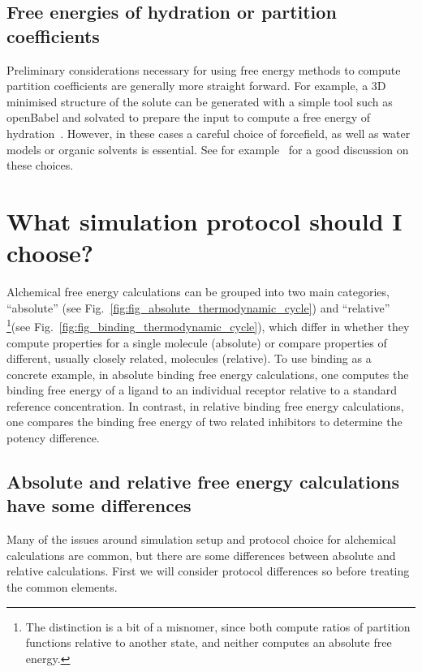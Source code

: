 \documentclass[9pt,bestpractices]{livecoms}
\begin{document}
\subsection{Free energies of hydration or partition coefficients}
\label{subsec:hydration}
Preliminary considerations necessary for using free energy methods to compute partition coefficients are generally more straight forward. For example, a 3D minimised structure of the solute can be generated with a simple tool such as openBabel and solvated to prepare the input  to compute a free energy of hydration~\cite{oboyle2011open}. However, in these cases a careful choice of forcefield, as well as water models or organic solvents is essential. See for example~\cite{bosisio2016blinded,rustenburg2016measuring} for a good discussion on these choices. 
%
\section{What simulation protocol should I choose?}
\label{sec:simulation_protocol_choice}
Alchemical free energy calculations can be grouped into two main categories, ``absolute'' (see Fig.~\ref{fig:fig_absolute_thermodynamic_cycle}) and ``relative'' \footnote{The distinction is a bit of a misnomer, since both compute ratios of partition functions relative to another state, and neither computes an absolute free energy.}(see Fig.~\ref{fig:fig_binding_thermodynamic_cycle}), which differ in whether they compute properties for a single molecule (absolute) or compare properties of different, usually closely related, molecules (relative).
To use binding as a concrete example, in absolute binding free energy calculations, one computes the binding free energy of a ligand to an individual receptor relative to a standard reference concentration.
%
In contrast, in relative binding free energy calculations, one compares the binding free energy of two related inhibitors to determine the potency difference.
%
\subsection{Absolute and relative free energy calculations have some differences}
Many of the issues around simulation setup and protocol choice for alchemical calculations are common, but there are some differences between absolute and relative calculations. First we will consider protocol differences  so before treating the common elements.
%
\end{document}
